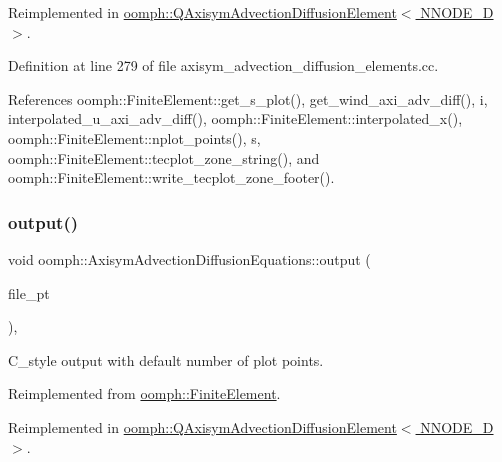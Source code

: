 Reimplemented in \hyperlink{classoomph_1_1QAxisymAdvectionDiffusionElement_a20cbe0ae52a064c6c5f6a065596beea5}{oomph\+::\+Q\+Axisym\+Advection\+Diffusion\+Element$<$ N\+N\+O\+D\+E\+\_\+D $>$}.



Definition at line 279 of file axisym\+\_\+advection\+\_\+diffusion\+\_\+elements.\+cc.



References oomph\+::\+Finite\+Element\+::get\+\_\+s\+\_\+plot(), get\+\_\+wind\+\_\+axi\+\_\+adv\+\_\+diff(), i, interpolated\+\_\+u\+\_\+axi\+\_\+adv\+\_\+diff(), oomph\+::\+Finite\+Element\+::interpolated\+\_\+x(), oomph\+::\+Finite\+Element\+::nplot\+\_\+points(), s, oomph\+::\+Finite\+Element\+::tecplot\+\_\+zone\+\_\+string(), and oomph\+::\+Finite\+Element\+::write\+\_\+tecplot\+\_\+zone\+\_\+footer().

\mbox{\label{classoomph_1_1AxisymAdvectionDiffusionEquations_a79345d7ee2f42aa679538839b5128a58}} 
\subsubsection{\texorpdfstring{output()}{output()}\hspace{0.1cm}{\footnotesize\ttfamily [3/4]}}
{\footnotesize\ttfamily void oomph\+::\+Axisym\+Advection\+Diffusion\+Equations\+::output (\begin{DoxyParamCaption}\item[{F\+I\+LE $\ast$}]{file\+\_\+pt }\end{DoxyParamCaption})\hspace{0.3cm}{\ttfamily [inline]}, {\ttfamily [virtual]}}



C\+\_\+style output with default number of plot points. 



Reimplemented from \hyperlink{classoomph_1_1FiniteElement_a72cddd09f8ddbee1a20a1ff404c6943e}{oomph\+::\+Finite\+Element}.



Reimplemented in \hyperlink{classoomph_1_1QAxisymAdvectionDiffusionElement_ac095435d0ae6a5f3d74fa474d93906f8}{oomph\+::\+Q\+Axisym\+Advection\+Diffusion\+Element$<$ N\+N\+O\+D\+E\+\_\+D $>$}.



